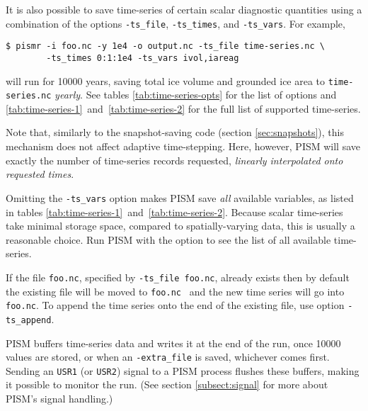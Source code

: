 It is also possible to save time-series of certain scalar diagnostic quantities using a combination of the options \texttt{-ts_file}, \texttt{-ts_times}, and \texttt{-ts_vars}.  For example,
\begin{verbatim}
$ pismr -i foo.nc -y 1e4 -o output.nc -ts_file time-series.nc \
        -ts_times 0:1:1e4 -ts_vars ivol,iareag
\end{verbatim} %
will run for 10000 years, saving total ice volume and grounded ice area to \texttt{time-series.nc} \emph{yearly}. See tables \ref{tab:time-series-opts} for the list of options and \ref{tab:time-series-1}~and~\ref{tab:time-series-2} for the full list of supported time-series.

Note that, similarly to the snapshot-saving code (section \ref{sec:snapshots}), this mechanism does not affect adaptive time-stepping.  Here, however, PISM will save exactly the number of time-series records requested, \emph{linearly interpolated onto requested times}.

Omitting the \texttt{-ts_vars} option makes PISM save \emph{all} available
variables, as listed in tables
\ref{tab:time-series-1}~and~\ref{tab:time-series-2}.  Because scalar
time-series take minimal storage space, compared to spatially-varying data,
this is usually a reasonable choice. Run PISM with the
 option to see the list of all available time-series.

If the file \texttt{foo.nc}, specified by \texttt{-ts_file foo.nc}, already exists then by default the existing file will be moved to \texttt{foo.nc~} and the new time series will go into \texttt{foo.nc}.  To append the time series onto the end of the existing file, use option \texttt{-ts_append}.

PISM buffers time-series data and writes it at the end of the run, once 10000
values are stored, or when an \texttt{-extra_file} is saved, whichever comes first. Sending an \texttt{USR1} (or
\texttt{USR2}) signal to a PISM process flushes these buffers, making it
possible to monitor the run. (See section \ref{subsect:signal} for more about
PISM's signal handling.)

